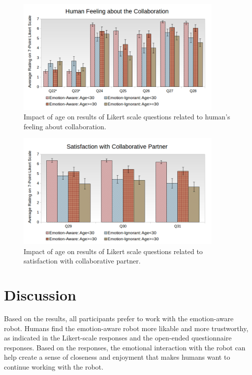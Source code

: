 \documentclass[12pt]{report}
\begin{document}
\begin{figure}[!h]
\centering
\includegraphics[width=0.9\textwidth]{figure/Age-Collaboration.png}
\caption{\fontsize{10pt}{10pt}\selectfont Impact of age on results of Likert
scale questions related to human's feeling about collaboration.}
\label{fig:age-collaboration}
\vspace*{15mm}
\end{figure}

\begin{figure}[!h]
\centering
\includegraphics[width=0.9\textwidth]{figure/Age-Satisfaction.png}
\caption{\fontsize{10pt}{10pt}\selectfont Impact of age on results of Likert
scale questions related to satisfaction with collaborative partner.}
\label{fig:age-satisfaction}
\end{figure}

\section{Discussion}
Based on the results, all participants prefer to work with the emotion-aware
robot. Humans find the emotion-aware robot more likable and more trustworthy, as
indicated in the Likert-scale responses and the open-ended questionnaire
responses. Based on the responses, the emotional interaction with the robot can
help create a sense of closeness and enjoyment that makes humans want to
continue working with the robot.
\end{document}
